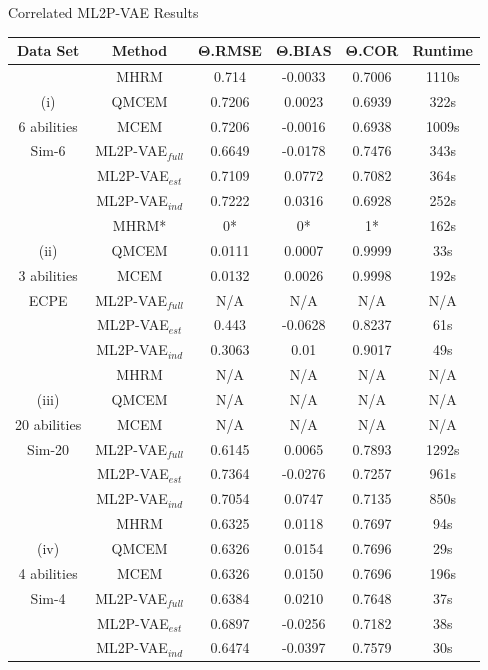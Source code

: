 \documentclass{beamer}
\newcommand{\vect}[1]{\boldsymbol{#1}}
\theoremstyle{definition}
\begin{document}
\begin{frame}{Correlated ML2P-VAE Results}
   \tiny
\begin{tabular}{c|c|ccc|c}
\hline
Data Set & Method & $\vect \Theta$.RMSE & $\vect \Theta$.BIAS & $\vect \Theta$.COR & Runtime \\
\hline
& MHRM & 0.714  & -0.0033  & 0.7006 & 1110s \\ 
(i)& QMCEM & 0.7206 & 0.0023 & 0.6939 & 322s\\
6 abilities& MCEM & 0.7206 & -0.0016 & 0.6938 & 1009s\\
Sim-6& ML2P-VAE$_{full}$ & 0.6649   & -0.0178  & 0.7476 & 343s\\
& ML2P-VAE$_{est}$ & 0.7109 &  0.0772  & 0.7082 & 364s \\
& ML2P-VAE$_{ind}$ & 0.7222 &  0.0316  & 0.6928 & 252s\\
\hline 
& MHRM* & 0* & 0* &  1* & 162s \\
(ii)& QMCEM & 0.0111 & 0.0007 & 0.9999 & 33s\\
3 abilities & MCEM & 0.0132 & 0.0026 & 0.9998 & 192s \\
ECPE & ML2P-VAE$_{full}$ & N/A & N/A & N/A & N/A  \\
& ML2P-VAE$_{est}$ & 0.443 & -0.0628 & 0.8237 & 61s  \\
& ML2P-VAE$_{ind}$ & 0.3063 & 0.01 & 0.9017 & 49s \\
\hline
& MHRM &               N/A & N/A & N/A & N/A  \\
(iii)& QMCEM &         N/A & N/A & N/A & N/A \\
20 abilities & MCEM &  N/A & N/A & N/A & N/A  \\
Sim-20 & ML2P-VAE$_{full}$ & 0.6145 &  0.0065  & 0.7893 & 1292s \\
& ML2P-VAE$_{est}$         & 0.7364   & -0.0276  & 0.7257 & 961s \\
& ML2P-VAE$_{ind}$         & 0.7054 &  0.0747  & 0.7135 & 850s \\
\hline 
& MHRM &              0.6325	& 0.0118	& 0.7697 & 94s \\
(iv)& QMCEM &         0.6326	& 0.0154	& 0.7696 & 29s \\
4 abilities & MCEM &  0.6326	& 0.0150	& 0.7696 & 196s \\
Sim-4 & ML2P-VAE$_{full}$ & 0.6384	& 0.0210	& 0.7648 & 37s \\
& ML2P-VAE$_{est}$       & 0.6897	& -0.0256 	& 0.7182 & 38s \\
& ML2P-VAE$_{ind}$       & 0.6474	& -0.0397	& 0.7579 & 30s \\
\hline
\end{tabular} 
\end{frame}
\end{document}
